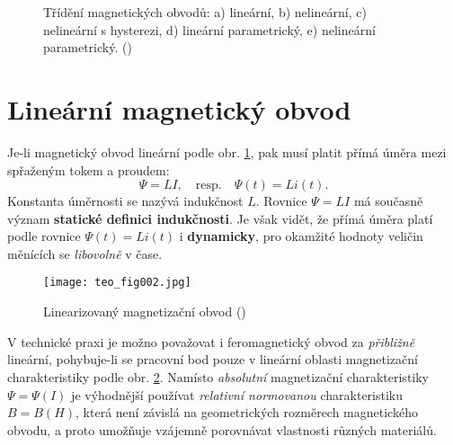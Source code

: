   
    \begin{figure}[ht!]  %
      \centering
       \newline
       \newline
      \caption{Třídění magnetických obvodů: a) lineární, b) nelineární, c) nelineární s hysterezi,
               d) lineární parametrický, e) nelineární parametrický.
               (\cite[s.~150]{Patocka4})}
      \label{teo:fig001}
    \end{figure}
    
  \section{Lineární magnetický obvod}\label{teo:IchapVsecII}
    Je-li magnetický obvod lineární podle obr. \ref{teo:fig001}, pak musí platit přímá úměra mezi 
    spřaženým tokem a proudem:
    \begin{equation}\label{TEO:eq001}
      \Psi    = LI, \quad\text{resp.}\quad
      \Psi(t) = Li(t).
    \end{equation}
    Konstanta úměrnosti se nazývá indukčnost \(L\). Rovnice \(\Psi=LI\) má současně význam 
    \textbf{statické definici indukčnosti}. Je však vidět, že přímá úměra platí podle rovnice 
    \(\Psi(t) = Li(t)\) i \textbf{dynamicky}, pro okamžité hodnoty veličin měnících se 
    \emph{libovolně} v čase.
    
    \begin{figure}[ht!]  %
      \centering
      \texttt{[image: teo\_fig002.jpg]}
      \caption{Linearizovaný magnetizační obvod
              (\cite[s.~151]{Patocka4})}
      \label{teo:fig002}
    \end{figure}
    
    V technické praxi je možno považovat i feromagnetický obvod za \emph{přibližně} lineární, 
    pohybuje-li se pracovní bod pouze v lineární oblasti magnetizační charakteristiky podle obr. 
    \ref{teo:fig002}. Namísto \emph{absolutní} magnetizační charakteristiky \(\Psi = \Psi(I)\) je 
    výhodnější používat \emph{relativní normovanou} charakteristiku  \(B= B(H)\), která není 
    závislá na geometrických rozměrech magnetického obvodu, a proto umožňuje vzájemně porovnávat 
    vlastnosti různých materiálů.

